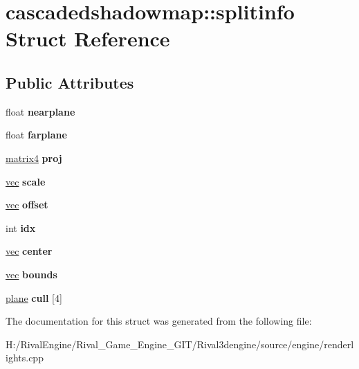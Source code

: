 \hypertarget{structcascadedshadowmap_1_1splitinfo}{}\section{cascadedshadowmap\+:\+:splitinfo Struct Reference}
\label{structcascadedshadowmap_1_1splitinfo}
\subsection*{Public Attributes}
\begin{DoxyCompactItemize}
\item 
\mbox{\label{structcascadedshadowmap_1_1splitinfo_ae4099c706737c16105b2ed6ac49f07d6}} 
float {\bfseries nearplane}
\item 
\mbox{\label{structcascadedshadowmap_1_1splitinfo_a1f4162ead46de68261de8b2a53aed6fc}} 
float {\bfseries farplane}
\item 
\mbox{\label{structcascadedshadowmap_1_1splitinfo_a6c496482efdfab312989b63e7511fb5e}} 
\hyperlink{structmatrix4}{matrix4} {\bfseries proj}
\item 
\mbox{\label{structcascadedshadowmap_1_1splitinfo_acbc496de57fc72e04162ec145698ae39}} 
\hyperlink{structvec}{vec} {\bfseries scale}
\item 
\mbox{\label{structcascadedshadowmap_1_1splitinfo_a68c238ff33f545b6f9a2d18928f06642}} 
\hyperlink{structvec}{vec} {\bfseries offset}
\item 
\mbox{\label{structcascadedshadowmap_1_1splitinfo_ad7eeb2eae309039af922bbe3a39c1b30}} 
int {\bfseries idx}
\item 
\mbox{\label{structcascadedshadowmap_1_1splitinfo_ad50a47de188c9d357b6eba01affef4ff}} 
\hyperlink{structvec}{vec} {\bfseries center}
\item 
\mbox{\label{structcascadedshadowmap_1_1splitinfo_ae680ad12ff293f0f92788ecc43b3656c}} 
\hyperlink{structvec}{vec} {\bfseries bounds}
\item 
\mbox{\label{structcascadedshadowmap_1_1splitinfo_ac70f34c25a891a0b72025cbb35806b0e}} 
\hyperlink{structplane}{plane} {\bfseries cull} \mbox{[}4\mbox{]}
\end{DoxyCompactItemize}


The documentation for this struct was generated from the following file\+:\begin{DoxyCompactItemize}
\item 
H\+:/\+Rival\+Engine/\+Rival\+\_\+\+Game\+\_\+\+Engine\+\_\+\+G\+I\+T/\+Rival3dengine/source/engine/renderlights.\+cpp\end{DoxyCompactItemize}
